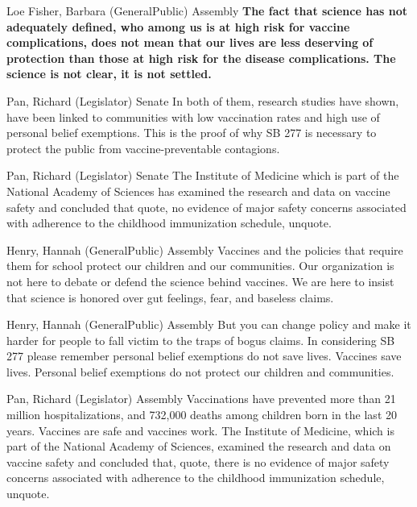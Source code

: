 \begin{result}{13.691386997566582}{Loe Fisher, Barbara (GeneralPublic) Assembly}
\textbf{The fact that science has not adequately defined, who among us is at high risk for vaccine complications, does not mean that our lives are less deserving of protection than those at high risk for the disease complications. The science is not clear, it is not settled.
}\end{result}

\begin{result}{13.028539089834828}{Pan, Richard (Legislator) Senate}
In both of them, research studies have shown, have been linked to communities with low vaccination rates and high use of personal belief exemptions. This is the proof of why SB 277 is necessary to protect the public from vaccine-preventable contagions.
\end{result}

\begin{result}{12.129959145841429}{Pan, Richard (Legislator) Senate}
The Institute of Medicine which is part of the National Academy of Sciences has examined the research and data on vaccine safety and concluded that quote, no evidence of major safety concerns associated with adherence to the childhood immunization schedule, unquote.
\end{result}

\begin{result}{11.458641196415645}{Henry, Hannah (GeneralPublic) Assembly}
Vaccines and the policies that require them for school protect our children and our communities. Our organization is not here to debate or defend the science behind vaccines. We are here to insist that science is honored over gut feelings, fear, and baseless claims.
\end{result}

\begin{result}{11.227696055896198}{Henry, Hannah (GeneralPublic) Assembly}
But you can change policy and make it harder for people to fall victim to the traps of bogus claims. In considering SB 277 please remember personal belief exemptions do not save lives. Vaccines save lives. Personal belief exemptions do not protect our children and communities.
\end{result}

\begin{result}{9.309836688528586}{Pan, Richard (Legislator) Assembly}
Vaccinations have prevented more than 21 million hospitalizations, and 732,000 deaths among children born in the last 20 years. Vaccines are safe and vaccines work. The Institute of Medicine, which is part of the National Academy of Sciences, examined the research and data on vaccine safety and concluded that, quote, there is no evidence of major safety concerns associated with adherence to the childhood immunization schedule, unquote.
\end{result}

